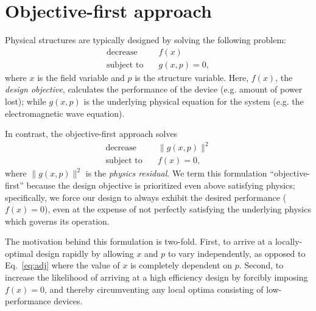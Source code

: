 \documentclass[letterpaper,10pt]{article}
\begin{document}
\section{Objective-first approach}
Physical structures are typically designed by solving the following problem:
    \begin{subequations}\label{eq:adj}
    \begin{align} 
    \text{decrease} & \quad f(x) \label{eq:adj:obj} \\ 
    \text{subject to} & \quad g(x,p) = 0, \label{eq:adj:con}
    \end{align}
    \end{subequations}
    where $x$ is the field variable and $p$ is the structure variable.
Here, $f(x)$, the \emph{design objective}, 
    calculates the performance of the device 
    (e.g. amount of power lost); 
    while $g(x,p)$ is the underlying physical equation for the system
    (e.g. the electromagnetic wave equation).

In contrast, the objective-first approach solves 
    \begin{subequations}\label{eq:ob1}
    \begin{align} 
    \text{decrease} & \quad \|g(x,p)\|^2 \label{eq:ob1:obj} \\ 
    \text{subject to} & \quad f(x) = 0, \label{eq:ob1:con}
    \end{align}
    \end{subequations}
    where $\|g(x,p)\|^2$ is the \emph{physics residual}.
We term this formulation ``objective-first''
    because the design objective is prioritized even above satisfying physics;
    specifically, we force our design to always exhibit the desired performance
    ($f(x) = 0$), even at the expense of
    not perfectly satisfying the underlying physics which governs its operation.

The motivation behind this formulation is two-fold.
First, to arrive at a locally-optimal design rapidly 
    by allowing $x$ and $p$ to vary independently, 
    as opposed to Eq.~\ref{eq:adj}
    where the value of $x$ is completely dependent on $p$.
Second, to increase the likelihood of arriving at a high efficiency design
    by forcibly imposing $f(x) = 0$,
    and thereby circumventing any local optima consisting of
    low-performance devices.
\end{document}
